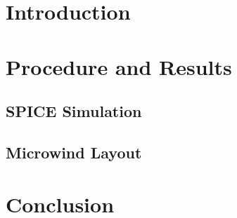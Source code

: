\documentclass{article}
\begin{document}
\begin{titlepage}

\end{titlepage}
\section{Introduction}

\section{Procedure and Results}
\subsection{SPICE Simulation}

\subsection{Microwind Layout}

\section{Conclusion}

\end{document}
